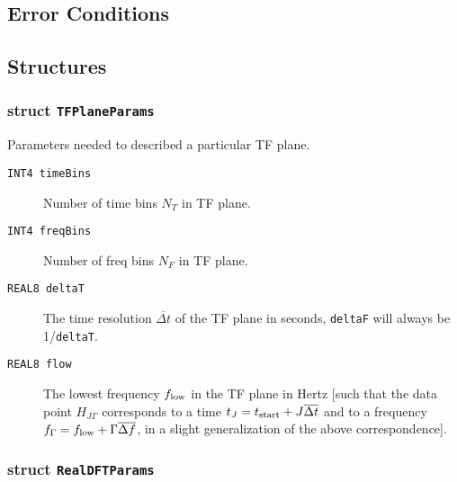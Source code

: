 \subsection*{Error Conditions}


\subsection*{Structures}

\subsubsection*{struct \texttt{TFPlaneParams}}

\noindent Parameters needed to described a particular TF plane.

\begin{description}
\item[\texttt{INT4 timeBins}] Number of time bins $N_T$ in TF plane. 

\item[\texttt{INT4 freqBins}] Number of freq bins $N_F$ in TF plane.

\item[\texttt{REAL8 deltaT}] The time resolution ${\overline {\Delta t}}$ 
of the TF plane in seconds, \texttt{deltaF} will always be 1/\texttt{deltaT}.

\item[\texttt{REAL8 flow}] The lowest frequency $f_{\rm low}$ in the TF plane
in Hertz [such that the data point $H_{J\Gamma}$ corresponds to a time $t_J =
t_{\rm start} + J {\overline {\Delta t}}$ and to a frequency $f_\Gamma =
f_{\rm low} + \Gamma {\overline {\Delta f}}$, in a slight generalization of
the above correspondence].
\end{description}

\subsubsection*{struct \texttt{RealDFTParams}}

